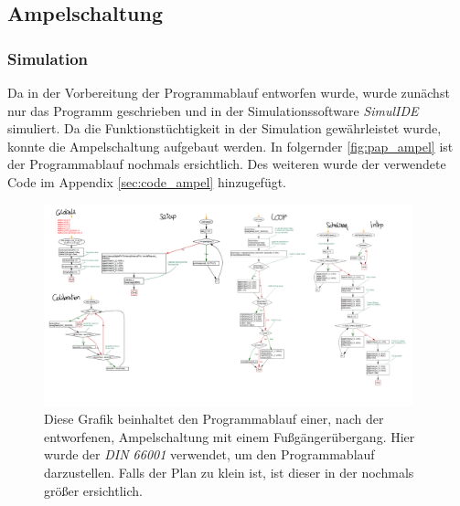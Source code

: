 \documentclass[12pt,english,ngerman]{scrartcl}
\begin{document}


\subsection{Ampelschaltung}


\subsubsection{Simulation}

Da in der Vorbereitung der Programmablauf entworfen wurde, wurde
zunächst nur das Programm geschrieben und in der Simulationssoftware
\textit{SimulIDE} simuliert. Da die Funktionstüchtigkeit in der
Simulation gewährleistet wurde, konnte die Ampelschaltung aufgebaut
werden. In folgernder \autoref{fig:pap_ampel} ist der Programmablauf
nochmals ersichtlich. Des weiteren wurde der verwendete Code im Appendix
\ref{sec:code_ampel} hinzugefügt.

\begin{figure}[H]
  \centering
   \includegraphics[width=0.95\textwidth]{./figures/sim/papampel.pdf}
    \caption{Diese Grafik beinhaltet den Programmablauf einer, nach der
       entworfenen, Ampelschaltung mit
      einem Fußgängerübergang. Hier wurde der \textit{DIN 66001}
      verwendet, um den Programmablauf darzustellen. Falls der Plan
      zu klein ist, ist dieser in der  nochmals größer ersichtlich.}
  \label{fig:pap_ampel}
\end{figure}
\end{document}
